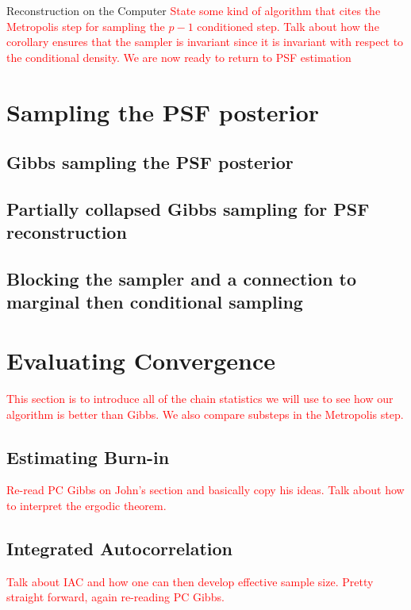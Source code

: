 \begin{chapter}{Reconstruction on the Computer}
\textcolor{red}{
  State some kind of algorithm that cites the Metropolis step for sampling the $p-1$ conditioned step.
  Talk about how the corollary ensures that the sampler is invariant since it is invariant with respect to the conditional density.
  We are now ready to return to PSF estimation
}

\section{Sampling the PSF posterior}
  \subsection{Gibbs sampling the PSF posterior}
  \subsection{Partially collapsed Gibbs sampling for PSF reconstruction}
  \subsection{Blocking the sampler and a connection to marginal then conditional sampling}

\section{Evaluating Convergence} \label{sec:evaluatingConvergence}
\textcolor{red}{
  This section is to introduce all of the chain statistics we will use to see how our algorithm is better than Gibbs.
  We also compare substeps in the Metropolis step.
}
  \subsection{Estimating Burn-in}
  \textcolor{red}{
  Re-read PC Gibbs on John's section and basically copy his ideas.
  Talk about how to interpret the ergodic theorem.
  }
  \subsection{Integrated Autocorrelation}
  \textcolor{red}{
  Talk about IAC and how one can then develop effective sample size.  
  Pretty straight forward, again re-reading PC Gibbs.  
}

\end{chapter}
